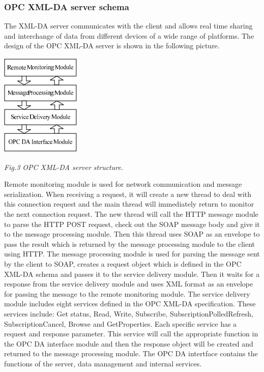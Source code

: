 \documentclass[twosided,a4,10pt]{article}
\begin{document}
\begin{multicols}{2}
	\subsubsection{OPC XML-DA server schema}
	The XML-DA server communicates with the client and allows real time sharing and interchange of data from different devices of a wide range of platforms. The design of the OPC XML-DA server is shown in the following picture.\newline
	\begin{center}
	\includegraphics[scale=0.65]{XML-DA-server.png}
	\end{center}
	\begin{center}
	\textit{Fig.3 OPC XML-DA server structure.}
	\end{center}
	Remote monitoring module is used for network communication and message serialization. When receiving a request, it will create a new thread to deal with this connection request and the main thread will immediately return to monitor the next connection request. The new thread will call the HTTP message module to parse the HTTP POST request, check out the SOAP message body and give it to the message processing module. Then this thread uses SOAP as an envelope to pass the result which is returned by the message processing module to the client using HTTP.\newline
	The message processing module is used for parsing the message sent by the client to SOAP, creates a request object which is defined in the OPC XML-DA schema and passes it to the service delivery module. Then it waits for a response from the service delivery module and uses XML format as an envelope for passing the message to the remote monitoring module.\newline
	The service delivery module includes eight services defined in the OPC XML-DA specification. These services include: Get status, Read, Write, Subscribe, SubscriptionPolledRefresh, SubscriptionCancel, Browse and GetProperties. Each specific service has a request and response parameter. This service will call the appropriate function in the OPC DA interface module and then the response object will be created and returned to the message processing module.\newline
	The OPC DA intertface contains the functions of the server, data management and internal services. 

\end{multicols}
\end{document}
